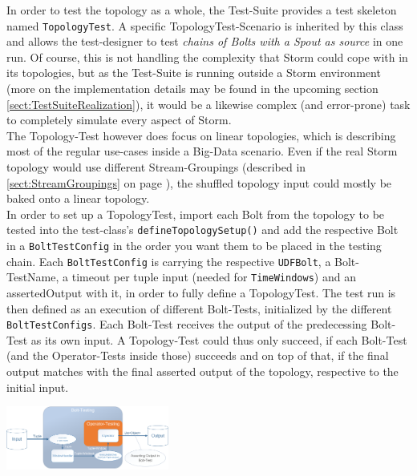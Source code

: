 \begin{description}
		In order to test the topology as a whole, the Test-Suite provides a test skeleton named \texttt{TopologyTest}. A specific TopologyTest-Scenario is inherited by this class and allows the test-designer to test \textit{chains of Bolts with a Spout as source} in one run. Of course, this is not handling the complexity that Storm could cope with in its topologies, but as the Test-Suite is running outside a Storm environment (more on the implementation details may be found in the upcoming section \ref{sect:TestSuiteRealization}), it would be a likewise complex (and error-prone) task to completely simulate every aspect of Storm.\\
		The Topology-Test however does focus on linear topologies, which is describing most of the regular use-cases inside a Big-Data scenario. Even if the real Storm topology would use different Stream-Groupings (described in \ref{sect:StreamGroupings} on page \pageref{StreamGroupings}), the shuffled topology input could mostly be baked onto a linear topology. \\
		In order to set up a TopologyTest, import each Bolt from the topology to be tested into the test-class's \texttt{defineTopologySetup()} and add the respective Bolt in a \texttt{BoltTestConfig} in the order you want them to be placed in the testing chain. Each \texttt{BoltTestConfig} is carrying the respective \texttt{UDFBolt}, a Bolt-TestName, a timeout per tuple input (needed for \texttt{TimeWindows}) and an assertedOutput with it, in order to fully define a TopologyTest. The test run is then defined as an execution of different Bolt-Tests, initialized by the different \texttt{BoltTestConfigs}. Each Bolt-Test receives the output of the predecessing Bolt-Test as its own input. A Topology-Test could thus only succeed, if each Bolt-Test (and the Operator-Tests inside those) succeeds and on top of that, if the final output matches with the final asserted output of the topology, respective to the initial input.
		\begin{center}
			\includegraphics[width=0.4\textwidth]{./images/09_testing/BoltTests.png}
		\end{center}
		
	\end{description}


